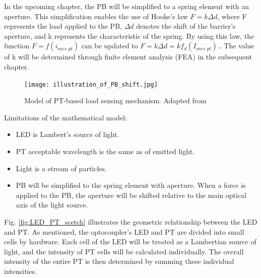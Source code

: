 In the upcoming chapter, the PB will be simplified to a spring element with an aperture. 
This simplification enables the use of Hooke's law $F = k\Delta d$, where F represents the load applied 
to the PB, $\Delta d$ denotes the shift of the barrier's aperture, and k represents the 
characteristic of the spring. 
By using this law, the function $F = f(i_{\textit{mes pt}})$ can be updated to $F = k \Delta d = k f_d(I_{\textit{mes pt}})$..
The value of k will be determined through finite element analysis (FEA) in the subsequent chapter. 

\begin{figure}[H]
  \centering
  \texttt{[image: illustration\_of\_PB\_shift.jpg]}
  \caption{Model of PT-based load sensing mechanism. Adapted from \cite[Fig. 1]{my_love_pressure_photosensor}}
  \label{fig:load_pt_based_mechanism}
  \end{figure}

Limitations of the mathematical model:
\begin{itemize}
    \item LED is Lambert's source of light.
    \item PT acceptable wavelength is the same as of emitted light.
    \item Light is a stream of particles.
    \item PB will be simplified to the spring element with aperture. When a force is applied to the PB, the aperture will be shifted relative to the main optical axis of the light source.
\end{itemize}

Fig. \ref{fig:LED_PT_scetch} illustrates the geometric relationship between the LED and PT. 
As mentioned, the optocoupler's LED and PT are divided into small cells by hardware.
 Each cell of the LED will be treated as a Lambertian source of light, and the intensity 
 of PT cells will be calculated individually. 
 The overall intensity of the entire PT is then determined by summing these individual intensities. 

